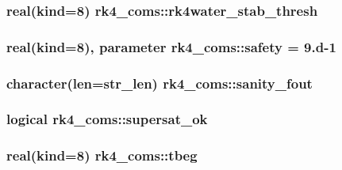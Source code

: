 \subsubsection[{\texorpdfstring{rk4water\+\_\+stab\+\_\+thresh}{rk4water_stab_thresh}}]{\setlength{\rightskip}{0pt plus 5cm}real(kind=8) rk4\+\_\+coms\+::rk4water\+\_\+stab\+\_\+thresh}\hypertarget{namespacerk4__coms_a9a7486e4755f548d744d266af9052d4f}{}\label{namespacerk4__coms_a9a7486e4755f548d744d266af9052d4f}
\subsubsection[{\texorpdfstring{safety}{safety}}]{\setlength{\rightskip}{0pt plus 5cm}real(kind=8), parameter rk4\+\_\+coms\+::safety = 9.d-\/1}\hypertarget{namespacerk4__coms_ab0aa0551adf0417c09a0a0e4f4bcb934}{}\label{namespacerk4__coms_ab0aa0551adf0417c09a0a0e4f4bcb934}
\subsubsection[{\texorpdfstring{sanity\+\_\+fout}{sanity_fout}}]{\setlength{\rightskip}{0pt plus 5cm}character(len=str\+\_\+len) rk4\+\_\+coms\+::sanity\+\_\+fout}\hypertarget{namespacerk4__coms_a673279a49daaa7f21ade0992c6fe0c0d}{}\label{namespacerk4__coms_a673279a49daaa7f21ade0992c6fe0c0d}
\subsubsection[{\texorpdfstring{supersat\+\_\+ok}{supersat_ok}}]{\setlength{\rightskip}{0pt plus 5cm}logical rk4\+\_\+coms\+::supersat\+\_\+ok}\hypertarget{namespacerk4__coms_a304419c7dc18d710be779d2d1a1378e7}{}\label{namespacerk4__coms_a304419c7dc18d710be779d2d1a1378e7}
\subsubsection[{\texorpdfstring{tbeg}{tbeg}}]{\setlength{\rightskip}{0pt plus 5cm}real(kind=8) rk4\+\_\+coms\+::tbeg}\hypertarget{namespacerk4__coms_a9b09c4fc7f09c642c1115df229cedb1e}{}\label{namespacerk4__coms_a9b09c4fc7f09c642c1115df229cedb1e}
